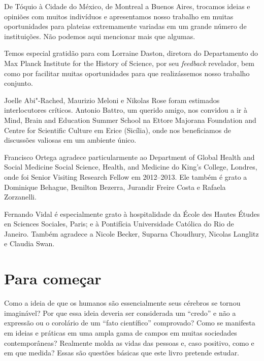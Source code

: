 De Tóquio à Cidade do México, de Montreal a Buenos Aires, trocamos
ideias e opiniões com muitos indivíduos e apresentamos nosso trabalho em
muitas oportunidades para plateias extremamente variadas em um grande
número de instituições. Não podemos aqui mencionar mais que algumas.

Temos especial gratidão para com Lorraine Daston, diretora do
Departamento  do Max Planck Institute for the History of Science, por
seu \emph{feedback} revelador, bem como por facilitar muitas
oportunidades para que realizássemos nosso trabalho conjunto.

Joelle Abi"-Rached, Maurizio Meloni e Nikolas Rose foram estimados
interlocutores críticos. Antonio Battro, um querido amigo, nos convidou
a ir à Mind, Brain and Education Summer School na Ettore Majorana
Foundation and Centre for Scientific Culture em Erice (Sicília), onde
nos beneficiamos de discussões valiosas em um ambiente único.

Francisco Ortega agradece particularmente ao Department of Global Health
and Social Medicine Social Science, Health, and Medicine do King's
College, Londres, onde foi Senior Visiting Research Fellow em
2012--2013. Ele também é grato a Dominique Behague, Benilton Bezerra,
Jurandir Freire Costa e Rafaela Zorzanelli.

Fernando Vidal é especialmente grato à hospitalidade da École des Hautes
Études en Sciences Sociales, Paris; e à Pontifícia Universidade Católica
do Rio de Janeiro. Também agradece a Nicole Becker, Suparna Choudhury,
Nicolas Langlitz e Claudia Swan.

\chapter*{Para começar}

Como a ideia de que os humanos são essencialmente seus cérebros se
tornou imaginável? Por que essa ideia deveria ser considerada um
``credo'' e não a expressão ou o corolário de um ``fato científico''
comprovado? Como se manifesta em ideias e práticas em uma ampla gama de
campos em muitas sociedades contemporâneas? Realmente molda as vidas das
pessoas e, caso positivo, como e em que medida? Essas são questões
básicas que este livro pretende estudar.

